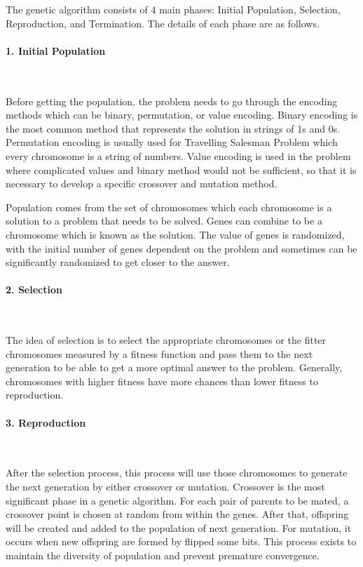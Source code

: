 \documentclass[12pt,oneside,openright,a4paper]{cpe-english-project}
\begin{document}
The genetic algorithm consists of 4 main phases: Initial Population, Selection, Reproduction, and Termination. The details of each phase are as follows.


\paragraph*{1. Initial Population}\

Before getting the population, the problem needs to go through the encoding methods which can be binary, permutation, or value encoding. Binary encoding is the most common method that represents the solution in strings of 1s and 0s. Permutation encoding is usually used for Travelling Salesman Problem which every chromosome is a string of numbers. Value encoding is used in the problem where complicated values and binary method would not be sufficient, so that it is necessary to develop a specific crossover and mutation method.

Population comes from the set of chromosomes which each chromosome is a solution to a problem that needs to be solved. Genes can combine to be a chromosome which is known as the solution. The value of genes is randomized, with the initial number of genes dependent on the problem and sometimes can be significantly randomized to get closer to the answer.

\paragraph*{2. Selection}\

The idea of selection is to select the appropriate chromosomes or the fitter chromosomes measured by a fitness function and pass them to the next generation to be able to get a more optimal answer to the problem. Generally, chromosomes with higher fitness have more chances than lower fitness to reproduction.

\paragraph*{3. Reproduction}\

After the selection process, this process will use those chromosomes to generate the next generation by either crossover or mutation. Crossover is the most significant phase in a genetic algorithm. For each pair of parents to be mated, a crossover point is chosen at random from within the genes. \cite{IntroductiontoGeneticAlgorithmsIncludingExampleCode} After that, offspring will be created and added to the population of next generation. For mutation, it occurs when new offspring are formed by flipped some bits. This process exists to maintain the diversity of population and prevent premature convergence.
\end{document}
